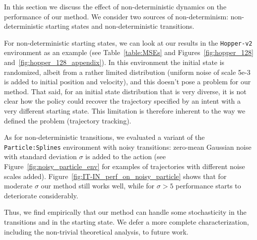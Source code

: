 \documentclass[nohyperref]{article}
\begin{document}
In this section we discuss the effect of non-deterministic dynamics on the performance of our method. We consider two sources of non-determinism: non-deterministic starting states and non-deterministic transitions.

For non-deterministic starting states, we can look at our results in the \texttt{Hopper-v2} environment as an example (see Table~\ref{table:MSEs} and Figures~\ref{fig:hopper_128} and~\ref{fig:hopper_128_appendix}). In this environment the initial state is randomized, albeit from a rather limited distribution (uniform noise of scale 5e-3 is added to initial position and velocity), and this doesn't pose a problem for our method. That said, for an initial state distribution that is very diverse, it is not clear how the policy could recover the trajectory specified by an intent with a very different starting state. This limitation is therefore inherent to the way we defined the problem (trajectory tracking).

As for non-deterministic transitions, we evaluated a variant of the \texttt{Particle:Splines} environment with noisy transitions: zero-mean Gaussian noise with standard deviation $\sigma$ is added to the action (see Figure~\ref{fig:noisy_particle_env} for examples of trajectories with different noise scales added). Figure~\ref{fig:IT-IN_perf_on_noisy_particle} shows that for moderate $\sigma$ our method still works well, while for $\sigma > 5$ performance starts to deteriorate considerably.

Thus, we find empirically that our method can handle some stochasticity in the transitions and in the starting state. We defer a more complete characterization, including the non-trivial theoretical analysis, to future work.
\end{document}
